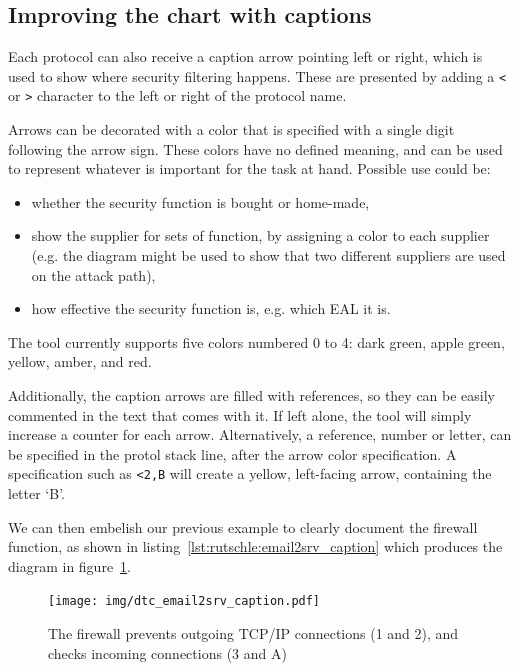 \documentclass{article}
\begin{document}
\subsection{Improving the chart with captions}


    Each protocol can also receive a caption arrow pointing left or right,
    which is used to show where security filtering happens. These are presented
    by adding a \verb+<+ or \verb+>+ character to the left or right of the protocol name.

    Arrows can be decorated with a color that is specified with a single digit
    following the arrow sign. These colors have no defined meaning, and can be
    used to represent whatever is important for the task at hand. Possible use
    could be:
    \begin{itemize}
	    \item whether the security function is bought or home-made,
	    \item show the supplier for sets of function, by assigning a color
		    to each supplier (e.g. the diagram might be used to show
		    that two different suppliers are used on the attack path),
	    \item how effective the security function is, e.g. which EAL it is.
    \end{itemize}

    The tool currently supports five colors numbered 0 to 4: dark green, apple green, yellow, amber, and red.

    Additionally, the caption arrows are filled with references, so they can be easily commented in the text that comes with it. If left alone, the tool will simply increase a counter for each arrow. Alternatively, a reference, number or letter, can be specified in the protol stack line, after the arrow color specification. A specification such as \verb+<2,B+ will create a yellow, left-facing arrow, containing the letter `B'.

    We can then embelish our previous example to clearly document the firewall function, as shown in listing~\ref{lst:rutschle:email2srv_caption} which produces the diagram in figure~\ref{fig:rutschle:email2srv_caption}.




\begin{figure}[ht]
	\centering
	\texttt{[image: img/dtc\_email2srv\_caption.pdf]}
	\caption{The firewall prevents outgoing TCP/IP connections (1 and 2), and checks incoming connections (3 and A)}
	\label{fig:rutschle:email2srv_caption}
\end{figure}
\end{document}
